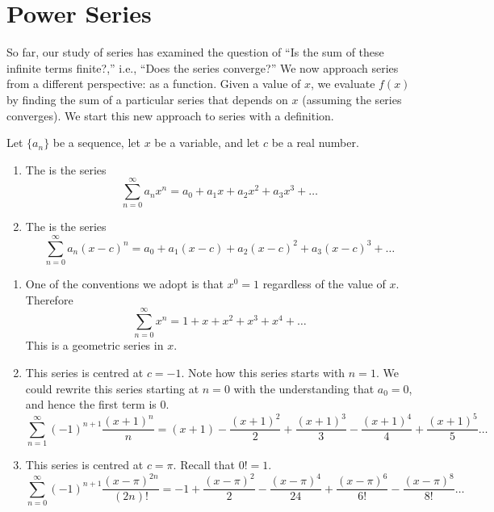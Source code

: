 \section{Power Series}\label{sec:power_series}

So far, our study of series has examined the question of ``Is the sum of these infinite terms finite?,'' i.e., ``Does the series converge?'' We now approach series from a different perspective: as a function. Given a value of $x$, we evaluate $f(x)$ by finding the sum of a particular series that depends on $x$ (assuming the series converges). We start this new approach to series with a definition.

{Let $\{a_n\}$ be a sequence, let $x$ be a variable, and let $c$ be a real number.
	\begin{enumerate}
		\item The  is the series
		$$\sum_{n=0}^\infty a_nx^n = a_0+a_1x+a_2x^2+a_3x^3+\ldots$$
		
		\item The  is the series
		$$\sum_{n=0}^\infty a_n(x-c)^n = a_0+a_1(x-c)+a_2(x-c)^2+a_3(x-c)^3+\ldots$$
	\end{enumerate}
}

{\begin{enumerate}
	\item One of the conventions we adopt is that $x^0=1$ regardless of the value of $x$. Therefore
	$$\sum_{n=0}^\infty x^n = 1+x+x^2+x^3+x^4+\ldots$$
	This is a geometric series in $x$.
	
	\item	This series is centred at $c=-1$. Note how this series starts with $n=1$. We could rewrite this series starting at $n=0$ with the understanding that $a_0=0$, and hence the first term is $0$.
	$$\sum_{n=1}^\infty (-1)^{n+1}\frac{(x+1)^n}n = (x+1) - \frac{(x+1)^2}{2} + \frac{(x+1)^3}{3} - \frac{(x+1)^4}{4}+\frac{(x+1)^5}{5}\ldots$$
	
	\item		This series is centred at $c=\pi$. Recall that $0!=1$.
	$$\sum_{n=0}^\infty (-1)^{n+1} \frac{(x-\pi)^{2n}}{(2n)!} = -1+\frac{(x-\pi)^2}{2} - \frac{(x-\pi)^4}{24}+ \frac{(x-\pi)^6}{6!}-\frac{(x-\pi)^8}{8!}\ldots $$
\end{enumerate}
\baselineskip
}\\

